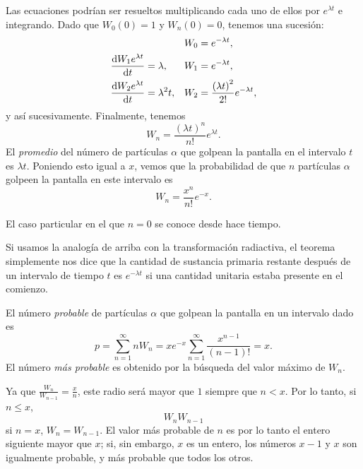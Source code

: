 Las ecuaciones podrían ser resueltos multiplicando cada uno de ellos por $e^{\lambda t}$ e integrando. Dado que $W_0(0)=1$ y $W_n(0)=0$, tenemos una sucesión:
\begin{align*}
	&& W_0&= e^{-\lambda t},\\
	\diff{W_1e^{\lambda t}}{t}&=\lambda, & W_1&= e^{-\lambda t},\\
	\diff{W_2e^{\lambda t}}{t}&=\lambda^2t, & W_2&=\frac{{\left(\lambda t\right)}^2}{2!}e^{-\lambda t},\\
\end{align*}
y así sucesivamente. Finalmente, tenemos
\begin{equation*}
	W_n=\frac{{\left(\lambda t\right)}^n}{n!}e^{\lambda t}.
\end{equation*}
El \emph{promedio} del número de  partículas $\alpha$ que golpean la pantalla en el intervalo $t$ es $\lambda t$. Poniendo esto igual a $x$, vemos que la probabilidad de que $n$ partículas $\alpha$ golpeen la pantalla en este intervalo es
\begin{equation*}
	W_n=\frac{x^n}{n!}e^{-x}.
\end{equation*}

El caso particular en el que $n=0$ se conoce desde hace tiempo. %

Si usamos la analogía de arriba con la transformación radiactiva, el teorema simplemente nos dice que la cantidad de sustancia primaria restante después de un intervalo de tiempo $t$ es $e^{-\lambda t}$ si una cantidad unitaria estaba presente en el comienzo.

El número \emph{probable} de partículas $\alpha$ que golpean la pantalla en un intervalo dado es
\begin{equation*}
	p=\sum_{n=1}^{\infty}nW_n=xe^{-x}\sum_{n=1}^{\infty}\frac{x^{n-1}}{\left(n-1\right)!}=x.
\end{equation*}
El número \emph{más probable} es obtenido por la búsqueda del valor máximo de $W_n$.

Ya que $\frac{W_n}{W_{n-1}}=\frac{x}{n}$, este radio será mayor que $1$ siempre que $n<x$. Por lo tanto, si $n\le x$, %
\begin{equation*}
	W_n W_{n-1}%
\end{equation*}
si $n=x$, $W_n=W_{n-1}$. El valor más probable de $n$ es por lo tanto el entero siguiente mayor que $x$; si, sin embargo, $x$ es un entero, los números $x-1$ y $x$ son igualmente probable, y más probable que todos los otros.

